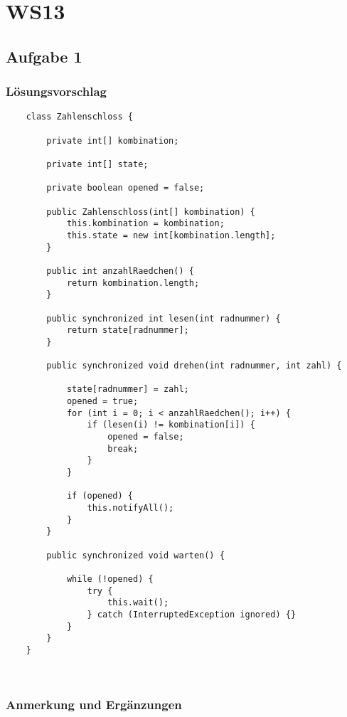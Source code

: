 \chapter{WS13}\label{ch:klausurws13}

\section{Aufgabe 1}
\subsection{Lösungsvorschlag}


\begin{verbatim}
    class Zahlenschloss {

        private int[] kombination;

        private int[] state;

        private boolean opened = false;

        public Zahlenschloss(int[] kombination) {
            this.kombination = kombination;
            this.state = new int[kombination.length];
        }

        public int anzahlRaedchen() {
            return kombination.length;
        }

        public synchronized int lesen(int radnummer) {
            return state[radnummer];
        }

        public synchronized void drehen(int radnummer, int zahl) {

            state[radnummer] = zahl;
            opened = true;
            for (int i = 0; i < anzahlRaedchen(); i++) {
                if (lesen(i) != kombination[i]) {
                    opened = false;
                    break;
                }
            }

            if (opened) {
                this.notifyAll();
            }
        }

        public synchronized void warten() {

            while (!opened) {
                try {
                    this.wait();
                } catch (InterruptedException ignored) {}
            }
        }
    }
\end{verbatim}\\


\subsection{Anmerkung und Ergänzungen}

